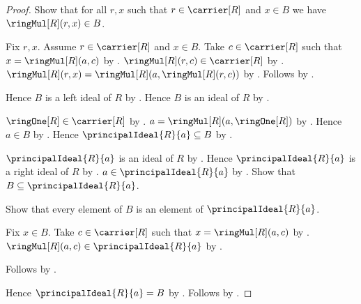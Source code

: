 \begin{proof}
    Show that for all $r,x$ such that $r\in\carrier[R]$ and $x\in B$
        we have $\ringMul[R](r,x)\in B$.
    \begin{subproof}
        Fix $r,x$.
        Assume $r\in\carrier[R]$ and $x\in B$.
        Take $c\in\carrier[R]$ such that
            $x=\ringMul[R](a,c)$ by \auto.
        $\ringMul[R](r,c)\in\carrier[R]$ by .
        $\ringMul[R](r,x)
            =\ringMul[R](a,\ringMul[R](r,c))$ by
            .
        Follows by \auto.
    \end{subproof}
    Hence $B$ is a left ideal of $R$ by
        .
    Hence $B$ is an ideal of $R$ by
        .

    $\ringOne[R]\in\carrier[R]$ by .
    $a=\ringMul[R](a,\ringOne[R])$ by .
    Hence $a\in B$ by \auto.
    Hence $\principalIdeal{R}{a}\subseteq B$ by
        .

    $\principalIdeal{R}{a}$ is an ideal of $R$ by
        .
    Hence $\principalIdeal{R}{a}$ is a right ideal of $R$ by
        .
    $a\in\principalIdeal{R}{a}$ by
        .
    Show that $B\subseteq\principalIdeal{R}{a}$.
    \begin{subproof}
        Show that every element of $B$ is an element of
            $\principalIdeal{R}{a}$.
        \begin{subproof}
            Fix $x\in B$.
            Take $c\in\carrier[R]$ such that
                $x=\ringMul[R](a,c)$ by \auto.
            $\ringMul[R](a,c)\in\principalIdeal{R}{a}$ by
                .
        \end{subproof}
        Follows by .
    \end{subproof}
    Hence $\principalIdeal{R}{a}=B$ by
        .
    Follows by \auto.
\end{proof}

